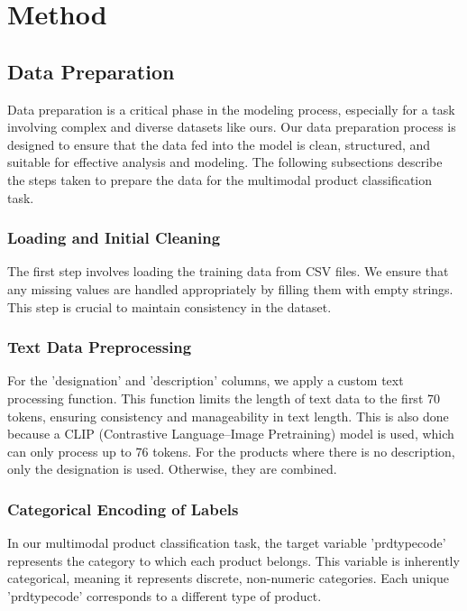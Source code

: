 \section{Method}
\label{sec:method}

\subsection{Data Preparation}
Data preparation is a critical phase in the modeling process, especially for a task involving complex and diverse datasets like ours. Our data preparation process is designed to ensure that the data fed into the model is clean, structured, and suitable for effective analysis and modeling. The following subsections describe the steps taken to prepare the data for the multimodal product classification task.

\subsubsection{Loading and Initial Cleaning}

The first step involves loading the training data from CSV files. We ensure that any missing values are handled appropriately by filling them with empty strings. This step is crucial to maintain consistency in the dataset. 

\subsubsection{Text Data Preprocessing}

For the 'designation' and 'description' columns, we apply a custom text processing function. This function limits the length of text data to the first 70 tokens, ensuring consistency and manageability in text length. This is also done because a CLIP (Contrastive Language–Image Pretraining) model is used, which can only process up to 76 tokens. For the products where there is no description, only the designation is used. Otherwise, they are combined.

\subsubsection{Categorical Encoding of Labels}

In our multimodal product classification task, the target variable 'prdtypecode' represents the category to which each product belongs. This variable is inherently categorical, meaning it represents discrete, non-numeric categories. Each unique 'prdtypecode' corresponds to a different type of product.
  
